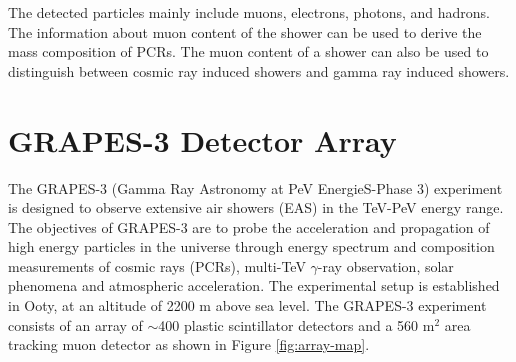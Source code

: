 \documentclass[12pt]{article}
\begin{document}
The detected particles mainly include muons, electrons, photons,  and hadrons. The information about muon content of the shower can be used to derive the mass composition of PCRs\cite{tanaka}. The muon content of a shower can also be used to distinguish between cosmic ray induced showers and gamma ray induced showers. 

\section{GRAPES-3 Detector Array}
The GRAPES-3 (Gamma Ray Astronomy at PeV EnergieS-Phase 3) experiment is designed to observe extensive air showers (EAS) in the TeV-PeV energy range\cite{gupta}. The objectives of GRAPES-3 are to probe the acceleration and propagation of high energy particles in the universe through energy spectrum and composition measurements of cosmic rays (PCRs), multi-TeV $\gamma$-ray observation, solar phenomena and atmospheric acceleration. The experimental setup is established in Ooty, at an altitude of 2200 m above sea level. The GRAPES-3 experiment \cite{anuj}\cite{gupta} consists of an array of $\sim$400 plastic scintillator detectors  and a 560 m$^2$ area tracking muon detector as shown in Figure \ref{fig:array-map}. 
\end{document}
